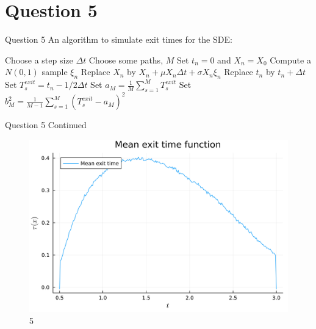 \documentclass[compress,12pt]{beamer}
\begin{document}
\section{Question 5}
\begin{frame}{Question 5}
An algorithm to simulate exit times for the SDE:
\begin{algorithmic}[1]
    \State Choose a step size $\Delta t$
    \State Choose some paths, $M$
        \State Set $t_n = 0$ and $X_n = X_0$
            \State Compute a $N(0,1)$ sample $\xi_n$
            \State Replace $X_n$ by $X_n + \mu X_n \Delta t + \sigma X_n \xi_n$
            \State Replace $t_n$ by $t_n + \Delta t$
        \EndWhile
        \State Set $T_s^{exit} = t_n - 1/2 \Delta t$
    \EndFor
    \State Set $a_M = \frac{1}{M} \sum_{s=1}^{M} T_s^{exit}$
    \State Set $b^2_M = \frac{1}{M-1} \sum_{s=1}^{M} (T_s^{exit} - a_M)^2$
\end{algorithmic}

\end{frame}

\begin{frame}{Question 5 Continued}
      \begin{figure}[H]
            \centering
            \includegraphics[scale=0.05]{imgs/5mean_exit_time.png}
            \caption{5}
            \label{fig:5}
      \end{figure}
\end{frame}
\end{document}
